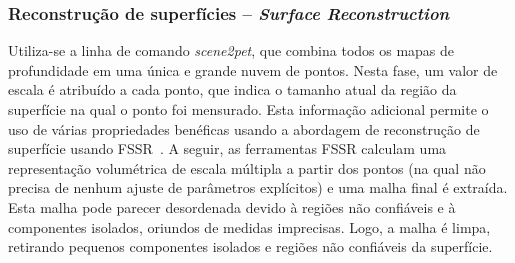 \subsubsection*{Reconstrução de superfícies -- \emph{Surface Reconstruction}}

Utiliza-se a linha de comando \emph{scene2pet}, que combina todos os mapas de profundidade em uma única e grande nuvem de pontos. Nesta fase, um valor de escala é atribuído a cada ponto, que indica o tamanho atual da região da superfície na qual o ponto foi mensurado. Esta informação adicional permite o uso de várias propriedades benéficas usando a abordagem de reconstrução de superfície usando FSSR~\cite{fuhrmann2014floating}.  
A seguir, as ferramentas FSSR calculam uma representação volumétrica de escala múltipla a partir dos pontos (na qual não precisa de nenhum ajuste de parâmetros explícitos) e uma malha final é extraída. Esta malha pode parecer desordenada devido à regiões não confiáveis e à componentes isolados, oriundos de medidas imprecisas. Logo, a malha é limpa, retirando pequenos componentes isolados e regiões não confiáveis da superfície. 




